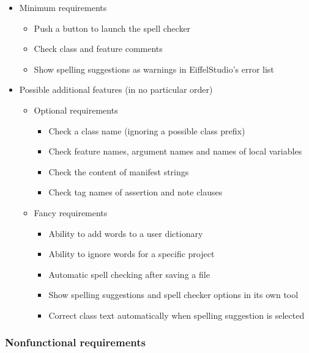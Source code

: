 \documentclass[paper=a4]{scrartcl}
\begin{document}
\begin{itemize}
\item Minimum requirements
\begin{itemize}
\item Push a button to launch the spell checker
\item Check class and feature comments
\item Show spelling suggestions as warnings in EiffelStudio’s error list
\end{itemize}
\item Possible additional features (in no particular order)
\begin{itemize}
\item Optional requirements
\begin{itemize}
\item Check a class name (ignoring a possible class prefix)
\item Check feature names, argument names and names of local variables
\item Check the content of manifest strings
\item Check tag names of assertion and note clauses
\end{itemize}
\item Fancy requirements
\begin{itemize}
\item Ability to add words to a user dictionary
\item Ability to ignore words for a specific project
\item Automatic spell checking after saving a file
\item Show spelling suggestions and spell checker options in its own tool
\item Correct class text automatically when spelling suggestion is selected
\end{itemize}
\end{itemize}
\end{itemize}

\subsubsection{Nonfunctional requirements}
\end{document}
